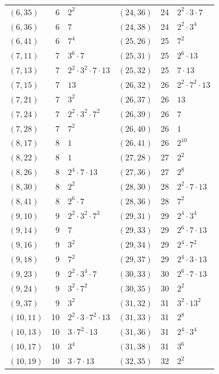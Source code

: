 \documentclass[11pt]{article}
\begin{document}
\begin{longtable}{@{}lrl@{\qquad}lrl@{}}
$(6,35)$ & 6 & $2^{2}$ & $(24,36)$ & 24 & $2^{2}\cdot 3\cdot 7$\\
$(6,36)$ & 6 & $7$ & $(24,38)$ & 24 & $2^{2}\cdot 3^{4}$\\
$(6,41)$ & 6 & $7^{4}$ & $(25,26)$ & 25 & $7^{2}$\\
$(7,11)$ & 7 & $3^{6}\cdot 7$ & $(25,31)$ & 25 & $2^{6}\cdot 13$\\
$(7,13)$ & 7 & $2^{2}\cdot 3^{2}\cdot 7\cdot 13$ & $(25,32)$ & 25 & $7\cdot 13$\\
$(7,15)$ & 7 & $13$ & $(26,32)$ & 26 & $2^{2}\cdot 7^{2}\cdot 13$\\
$(7,21)$ & 7 & $3^{2}$ & $(26,37)$ & 26 & $13$\\
$(7,24)$ & 7 & $2^{2}\cdot 3^{2}\cdot 7^{2}$ & $(26,39)$ & 26 & $7$\\
$(7,28)$ & 7 & $7^{2}$ & $(26,40)$ & 26 & $1$\\
$(8,17)$ & 8 & $1$ & $(26,41)$ & 26 & $2^{10}$\\
$(8,22)$ & 8 & $1$ & $(27,28)$ & 27 & $2^{2}$\\
$(8,26)$ & 8 & $2^{4}\cdot 7\cdot 13$ & $(27,36)$ & 27 & $2^{8}$\\
$(8,30)$ & 8 & $2^{2}$ & $(28,30)$ & 28 & $2^{2}\cdot 7\cdot 13$\\
$(8,41)$ & 8 & $2^{6}\cdot 7$ & $(28,36)$ & 28 & $7^{2}$\\
$(9,10)$ & 9 & $2^{2}\cdot 3^{2}\cdot 7^{3}$ & $(29,31)$ & 29 & $2^{4}\cdot 3^{4}$\\
$(9,14)$ & 9 & $7$ & $(29,33)$ & 29 & $2^{6}\cdot 7\cdot 13$\\
$(9,16)$ & 9 & $3^{2}$ & $(29,34)$ & 29 & $2^{4}\cdot 7^{2}$\\
$(9,18)$ & 9 & $7^{2}$ & $(29,37)$ & 29 & $2^{4}\cdot 3\cdot 13$\\
$(9,23)$ & 9 & $2^{2}\cdot 3^{4}\cdot 7$ & $(30,33)$ & 30 & $2^{6}\cdot 7\cdot 13$\\
$(9,24)$ & 9 & $3^{2}\cdot 7^{2}$ & $(30,35)$ & 30 & $2^{2}$\\
$(9,37)$ & 9 & $3^{2}$ & $(31,32)$ & 31 & $3^{2}\cdot 13^{2}$\\
$(10,11)$ & 10 & $2^{2}\cdot 3\cdot 7^{2}\cdot 13$ & $(31,33)$ & 31 & $2^{8}$\\
$(10,13)$ & 10 & $3\cdot 7^{2}\cdot 13$ & $(31,36)$ & 31 & $2^{4}\cdot 3^{4}$\\
$(10,17)$ & 10 & $3^{4}$ & $(31,38)$ & 31 & $3^{6}$\\
$(10,19)$ & 10 & $3\cdot 7\cdot 13$ & $(32,35)$ & 32 & $2^{2}$\\

\end{longtable}
\end{document}
